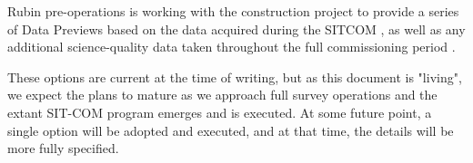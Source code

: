 Rubin pre-operations is working with the construction project to provide a series of Data Previews based on the data acquired during the SITCOM \svs, as well as any additional science-quality data taken throughout the full commissioning period \citep{RDO-011}.

These options are current at the time of writing, but as this document is "living",  we expect the plans to mature as we approach full survey operations and the extant SIT-COM program emerges and is executed. 
At some future point, a single option will be adopted and executed, and at that time, the details will be more fully specified. 


